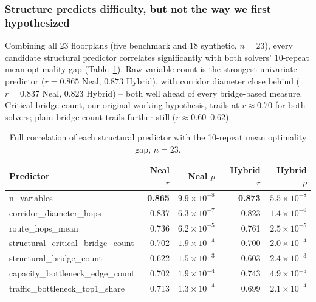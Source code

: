 \documentclass[11pt]{article}
\begin{document}
\subsubsection{Structure predicts difficulty, but not the way we first hypothesized}
Combining all 23 floorplans (five benchmark and 18 synthetic, $n=23$), every candidate structural predictor correlates significantly with both solvers' 10-repeat mean optimality gap (Table~\ref{tab:correlations}). Raw variable count is the strongest univariate predictor ($r=0.865$ Neal, $0.873$ Hybrid), with corridor diameter close behind ($r=0.837$ Neal, $0.823$ Hybrid) -- both well ahead of every bridge-based measure. Critical-bridge count, our original working hypothesis, trails at $r\approx0.70$ for both solvers; plain bridge count trails further still ($r\approx0.60$--$0.62$).

\begin{table}[h]
\centering
\caption{Full correlation of each structural predictor with the 10-repeat mean optimality gap, $n=23$.}
\label{tab:correlations}
\small
\begin{tabular}{lrrrr}
\toprule
Predictor & Neal $r$ & Neal $p$ & Hybrid $r$ & Hybrid $p$ \\
\midrule
n\_variables & \textbf{0.865} & $9.9\times10^{-8}$ & \textbf{0.873} & $5.5\times10^{-8}$ \\
corridor\_diameter\_hops & 0.837 & $6.3\times10^{-7}$ & 0.823 & $1.4\times10^{-6}$ \\
route\_hops\_mean & 0.736 & $6.2\times10^{-5}$ & 0.761 & $2.5\times10^{-5}$ \\
structural\_critical\_bridge\_count & 0.702 & $1.9\times10^{-4}$ & 0.700 & $2.0\times10^{-4}$ \\
structural\_bridge\_count & 0.622 & $1.5\times10^{-3}$ & 0.603 & $2.4\times10^{-3}$ \\
capacity\_bottleneck\_edge\_count & 0.702 & $1.9\times10^{-4}$ & 0.743 & $4.9\times10^{-5}$ \\
traffic\_bottleneck\_top1\_share & 0.713 & $1.3\times10^{-4}$ & 0.699 & $2.1\times10^{-4}$ \\
\bottomrule
\end{tabular}
\end{table}
\end{document}

